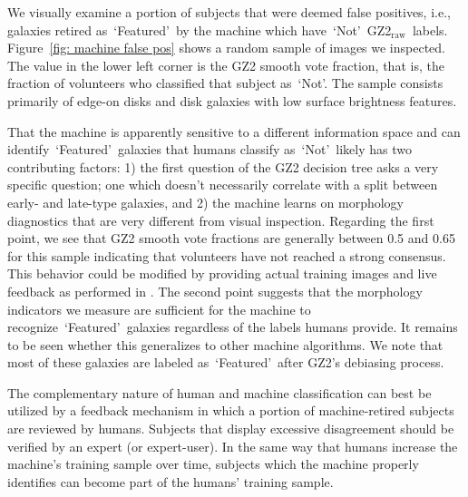 \documentclass[twocolumn]{aastex6}
\newcommand{\feat}{`Featured'}
\newcommand{\notfeat}{`Not'}
\newcommand{\raw}{GZ2$_{\text{raw}}$}
\begin{document}
We visually examine a portion of subjects that
were deemed false positives, i.e., galaxies retired as~\feat~by the machine which have~\notfeat~\raw~labels. 
Figure~\ref{fig: machine false pos} shows a random sample of images we inspected. 
The value in the lower left corner is the GZ2 smooth vote fraction, that is, the
fraction of volunteers who classified that subject as~\notfeat. The sample
consists primarily of edge-on disks and disk galaxies with low surface brightness
features. 

That the machine is apparently sensitive to a different information space and 
can identify~\feat~galaxies that humans classify as~\notfeat~likely has two 
 contributing factors: 
1) the first question of the GZ2 decision tree asks a very specific question; one which doesn't necessarily correlate with a split between early- and late-type galaxies, and 
 2) the machine learns on morphology diagnostics that are very different from visual inspection. 
Regarding the first point, we see that GZ2 smooth vote fractions are generally
 between 0.5 and 0.65 for this sample indicating that volunteers have not 
reached a strong consensus. This behavior could be modified by providing
actual training images and live feedback as performed in \cite{Marshall2016}. 
The second point suggests that the morphology indicators we measure are 
sufficient for the machine to recognize~\feat~galaxies regardless of the labels humans provide. 
It remains to be seen whether this generalizes to other machine algorithms.
We note that most of these galaxies are labeled as~\feat~after GZ2's debiasing process. 

The complementary nature of human and machine classification can 
best be utilized by a feedback mechanism in which a portion of machine-retired
subjects are reviewed by humans. Subjects that display excessive disagreement
should be verified by an expert (or expert-user).  In the same way that 
humans increase the machine's training sample over time, subjects which the
machine properly identifies can become part of the humans' training sample. 
 
\end{document}
